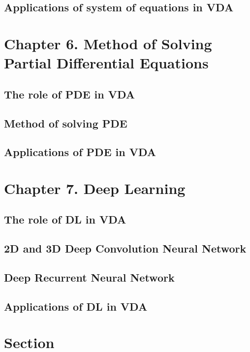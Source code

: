 \subsection{Applications of system of equations in VDA}

\section{Chapter 6. Method of Solving Partial Differential Equations}
\subsection{The role of PDE in VDA}
\subsection{Method of solving PDE}
\subsection{Applications of PDE in VDA}

\section{Chapter 7. Deep Learning}
\subsection{The role of DL in VDA}
\subsection{2D and 3D Deep Convolution Neural Network}
\subsection{Deep Recurrent Neural Network}
\subsection{Applications of DL in VDA}

% 











\section{Section}

